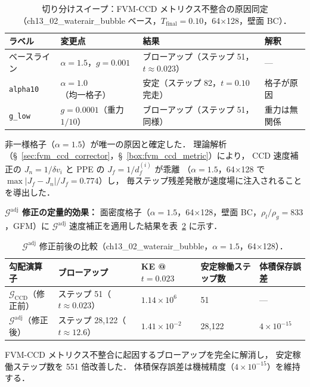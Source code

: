 \begin{table}[htbp]
\centering
\caption{切り分けスイープ：FVM-CCD メトリクス不整合の原因同定
（ch13\_02\_waterair\_bubble ベース，$T_\text{final}=0.10$，64$\times$128，壁面 BC）．}
\label{tab:gadjacent_bisect}
\renewcommand{\arraystretch}{1.3}
\begin{tabular}{llll}
\toprule
ラベル & 変更点 & 結果 & 解釈 \\
\midrule
ベースライン & $\alpha=1.5$，$g=0.001$ & ブローアップ（ステップ 51，$t\approx0.023$） & — \\
\texttt{alpha10} & $\alpha=1.0$（均一格子） & 安定（ステップ 82，$t=0.10$ 完走） & 格子が原因 \\
\texttt{g\_low} & $g=0.0001$（重力 $1/10$） & ブローアップ（ステップ 51，同様） & 重力は無関係 \\
\bottomrule
\end{tabular}
\end{table}

非一様格子（$\alpha=1.5$）が唯一の原因と確定した．
理論解析（§~\ref{sec:fvm_ccd_corrector}，§~\ref{box:fvm_ccd_metric}）により，
CCD 速度補正の $J_n = 1/\delta v_i$ と PPE の $J_f = 1/d_f^{(i)}$ が乖離
（$\alpha=1.5$，64$\times$128 で $\max|J_f - J_n|/J_f = 0.774$）し，
毎ステップ残差発散が速度場に注入されることを導出した．

\noindent\textbf{$\mathcal{G}^\text{adj}$ 修正の定量的効果：}
面密度格子（$\alpha=1.5$，64$\times$128，壁面 BC，$\rho_l/\rho_g = 833$，GFM）に
$\mathcal{G}^\text{adj}$ 速度補正を適用した結果を表~\ref{tab:gadjacent_result} に示す．

\begin{table}[htbp]
\centering
\caption{$\mathcal{G}^\text{adj}$ 修正前後の比較（ch13\_02\_waterair\_bubble，$\alpha=1.5$，64$\times$128）．}
\label{tab:gadjacent_result}
\renewcommand{\arraystretch}{1.3}
\begin{tabular}{lllll}
\toprule
勾配演算子 & ブローアップ & KE @ $t=0.023$ & 安定稼働ステップ数 & 体積保存誤差 \\
\midrule
$\mathcal{G}_\text{CCD}$（修正前） & ステップ 51（$t\approx0.023$） & $1.14\times10^{6}$ & 51 & — \\
$\mathcal{G}^\text{adj}$（修正後） & ステップ 28{,}122（$t\approx12.6$） & $1.41\times10^{-2}$ & 28{,}122 & $4\times10^{-15}$ \\
\bottomrule
\end{tabular}
\end{table}

FVM-CCD メトリクス不整合に起因するブローアップを完全に解消し，
安定稼働ステップ数を 551 倍改善した．
体積保存誤差は機械精度（$4\times10^{-15}$）を維持する．

